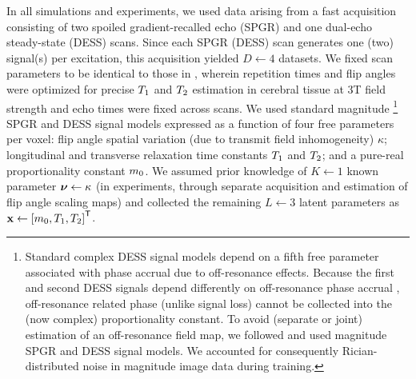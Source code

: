 In all simulations and experiments,
we used data arising 
from a fast acquisition \cite{nataraj:17:oms}
consisting of
two spoiled gradient-recalled echo (SPGR) \cite{zur:91:sot}
and 
one dual-echo steady-state (DESS) \cite{bruder:88:ans} scans.
Since each SPGR (DESS) scan 
generates one (two) signal(s) per excitation,
this acquisition yielded $D \gets 4$ datasets.
We fixed scan parameters 
to be identical 
to those in \cite{nataraj:17:oms},
wherein repetition times and flip angles were optimized
for precise $T_1$ and $T_2$ estimation 
in cerebral tissue at 3T field strength \cite{nataraj:17:oms}
and echo times were fixed across scans.
We used standard magnitude
\footnote{%
	Standard complex DESS signal models
	depend on a fifth free parameter
	associated with phase accrual 
	due to off-resonance effects. 
	Because the first and second DESS signals depend differently 
	on off-resonance phase accrual \cite{nataraj:17:oms},
	off-resonance related phase (unlike signal loss)
	cannot be collected 
	into the (now complex) proportionality constant.
	To avoid (separate or joint) estimation
	of an off-resonance field map,
	we followed \cite{nataraj:17:oms} and used
	magnitude SPGR and DESS signal models.
	We accounted for consequently Rician-distributed noise
	in magnitude image data
	during training.
}
SPGR and DESS signal models
expressed as a function
of four free parameters per voxel:
flip angle spatial variation
(due to transmit field inhomogeneity) $\kappa$;
longitudinal and transverse relaxation
time constants $T_1$ and $T_2$;
and a pure-real proportionality constant $m_0$. 
We assumed prior knowledge 
of $K \gets 1$ known parameter 
$\boldsymbol{\nu} \gets \kappa$
(in experiments,
through separate acquisition and estimation
of flip angle scaling maps)
and collected the remaining $L \gets 3$ latent parameters
as $\bmx \gets \brac{\mzero, \To, \Tt}\tpose$.

